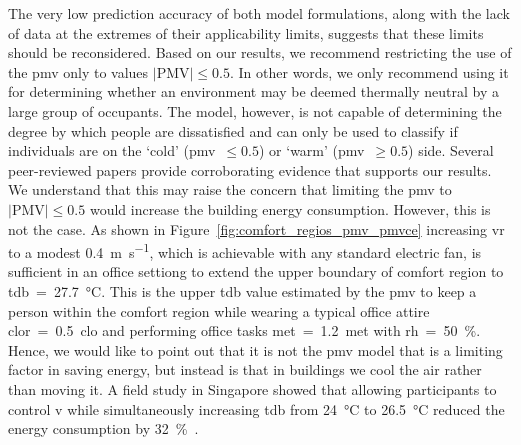 The very low prediction accuracy of both model formulations, along with the lack of data at the extremes of their applicability limits, suggests that these limits should be reconsidered.
Based on our results, we recommend restricting the use of the \ac{pmv} only to values $\lvert \textrm{PMV}\lvert \leq 0.5$.
In other words, we only recommend using it for determining whether an environment may be deemed thermally neutral by a large group of occupants.
The model, however, is not capable of determining the degree by which people are dissatisfied and can only be used to classify if individuals are on the `cold' (\ac{pmv}~$\leq 0.5$) or `warm' (\ac{pmv}~$\geq 0.5$) side.
Several peer-reviewed papers \cite{Cheung2019, Yao2022, kim2019thermal, tartarini2018thermal, Humphreys2002, doherty_evaluation_1988} provide corroborating evidence that supports our results.
We understand that this may raise the concern that limiting the \ac{pmv} to $\lvert \textrm{PMV}\lvert \leq 0.5$ would increase the building energy consumption.
However, this is not the case.
As shown in Figure~\ref{fig:comfort_regios_pmv_pmvce} increasing \ac{vr} to a modest \qty{0.4}{\m\per\s}, which is achievable with any standard electric fan, is sufficient in an office settiong to extend the upper boundary of comfort region to \ac{tdb}~=~\qty{27.7}{\celsius}.
This is the upper \ac{tdb} value estimated by the \ac{pmv} to keep a person within the comfort region while wearing a typical office attire \ac{clor}~=~\qty{0.5}{clo} and performing office tasks \ac{met}~=~\qty{1.2}{met} with \ac{rh}~=~\qty{50}{\percent}.
Hence, we would like to point out that it is not the \ac{pmv} model that is a limiting factor in saving energy, but instead is that in buildings we cool the air rather than moving it.
A field study in Singapore showed that allowing participants to control \ac{v} while simultaneously increasing \ac{tdb} from \qty{24}{\celsius} to \qty{26.5}{\celsius} reduced the energy consumption by \qty{32}{\percent}~\cite{kent_energy_2023}.

